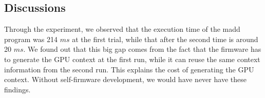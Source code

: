 \subsection{Discussions}

Through the experiment, we observed that the execution time of the madd
program was 214 $ms$ at the first trial, while that after the second
time is around 20 $ms$.
We found out that this big gap comes from the fact that the firmware has
to generate the GPU context at the first run, while it can reuse the
same context information from the second run.
This explains the cost of generating the GPU context.
Without self-firmware development, we would have never have these
findings.



